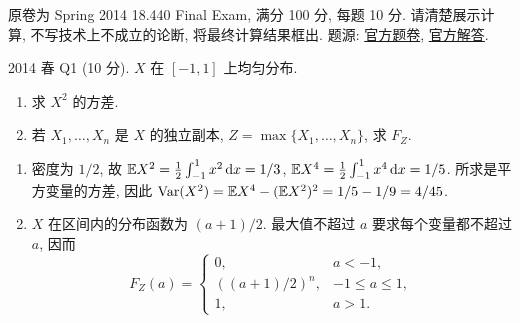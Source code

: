 原卷为 Spring 2014 18.440 Final Exam, 满分 100 分, 每题 10 分. 请清楚展示计算, 不写技术上不成立的论断, 将最终计算结果框出.
题源: \href{https://ocw.mit.edu/courses/18-600-probability-and-random-variables-fall-2019/resources/mit18_600f19_final_2014/}{官方题卷}, \href{https://ocw.mit.edu/courses/18-600-probability-and-random-variables-fall-2019/resources/mit18_600f19_final_2014_soln/}{官方解答}.

\begin{exercise}\label{ex:fe2014q1}
2014 春 Q1 (10 分). $X$ 在 $[-1,1]$ 上均匀分布.
\begin{enumerate}[label=(\alph*)]
\item\label{ex:fe2014q1-a} 求 $X^2$ 的方差.
\item\label{ex:fe2014q1-b} 若 $X_1,\ldots,X_n$ 是 $X$ 的独立副本, $Z=\max\{X_1,\ldots,X_n\}$, 求 $F_Z$.
\end{enumerate}
\end{exercise}
\begin{solution}
\begin{enumerate}[label=(\alph*)]
\item\label{sol:fe2014q1-a} 密度为 $1/2$, 故 $\mathbb E X^2=\frac12\int_{-1}^1x^2\,\mathrm d x=1/3$, $\mathbb E X^4=\frac12\int_{-1}^1x^4\,\mathrm d x=1/5$. 所求是平方变量的方差, 因此 $\operatorname{Var}(X^2)=\mathbb E X^4-(\mathbb E X^2)^2=1/5-1/9=4/45$.
\item\label{sol:fe2014q1-b} $X$ 在区间内的分布函数为 $(a+1)/2$. 最大值不超过 $a$ 要求每个变量都不超过 $a$, 因而
\[
 F_Z(a)=\begin{cases}0,&a<-1,\\((a+1)/2)^n,&-1\le a\le1,\\1,&a>1.\end{cases}
\]
\end{enumerate}
\end{solution}

